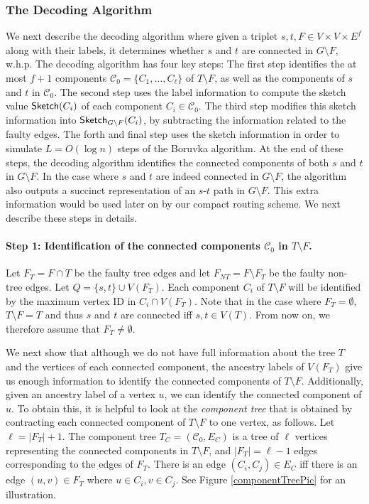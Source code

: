 \subsubsection{The Decoding Algorithm} \label{sec:dec-alg}
We next describe the decoding algorithm where given a triplet $s,t, F \in V \times V \times E^f$ along with their labels, it determines whether $s$ and $t$ are connected in $G\setminus F$, w.h.p. 
The decoding algorithm has four key steps: The first step identifies the at most $f+1$ components $\mathcal{C}_0=\{C_1,\ldots, C_\ell\}$ of $T \setminus F$, as well as the components of $s$ and $t$ in $\mathcal{C}_0$. The second step uses the label information to compute the sketch value $\mathsf{Sketch}(C_i)$ of each component $C_i \in \mathcal{C}_0$. The third step modifies this sketch information into $\mathsf{Sketch}_{G \setminus F}(C_i)$, by subtracting the information related to the faulty edges. The forth and final step uses the sketch information in order to simulate $L=O(\log n)$ steps of the Boruvka algorithm. At the end of these steps, the decoding algorithm identifies the connected components of both $s$ and $t$ in $G \setminus F$. In the case where $s$ and $t$ are indeed connected in $G \setminus F$, the algorithm also outputs a succinct representation of an $s$-$t$ path in $G \setminus F$. This extra information would be used later on by our compact routing scheme. We next describe these steps in details. 

\paragraph{Step 1: Identification of the connected components $\mathcal{C}_0$ in $T \setminus F$.} 
Let $F_T=F \cap T$ be the faulty tree edges and let $F_{NT}=F \setminus F_T$ be the faulty non-tree edges. Let $Q=\{s,t\} \cup V(F_T)$.  Each component $C_i$ of $T \setminus F$ will be identified by the maximum vertex ID in $C_i \cap V(F_T)$. Note that in the case where $F_T=\emptyset$, $T \setminus F=T$ and thus $s$ and $t$ are connected iff $s,t \in V(T)$.  From now on, we therefore assume that $F_T \neq \emptyset$. 

We next show that although we do not have full information about the tree $T$ and the vertices of each connected component, the ancestry labels of $V(F_T)$ give us enough information to identify the connected components of $T \setminus F$. Additionally, given an ancestry label of a vertex $u$, we can identify the connected component of $u$. To obtain this, it is helpful to look at the \emph{component tree} that is obtained by contracting each connected component of $T \setminus F$ to one vertex, as follows. Let $\ell = |F_T|+1.$ The component tree $T_C = (\mathcal{C}_0, E_C)$ is a tree of $\ell$ vertices representing the connected components in $T \setminus F$, and $|F_T|=\ell-1$ edges corresponding to the edges of $F_T$. There is an edge $(C_i,C_j) \in E_C$ iff there is an edge $(u,v) \in F_T$ where $u \in C_i, v \in C_j$. See Figure \ref{componentTreePic} for an illustration.  


